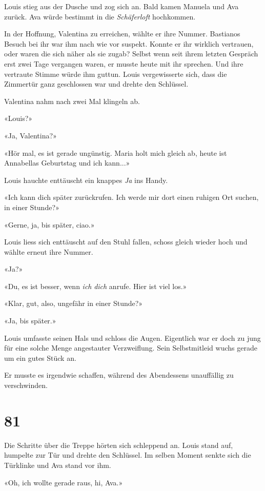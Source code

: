 Louis stieg aus der Dusche und zog sich an. Bald kamen Manuela und Ava
zurück. Ava würde bestimmt in die \emph{Schäferloft} hochkommen.

In der Hoffnung, Valentina zu erreichen, wählte er ihre Nummer.
Bastianos Besuch bei ihr war ihm nach wie vor suspekt. Konnte er ihr
wirklich vertrauen, oder waren die sich näher als sie zugab? Selbst wenn
seit ihrem letzten Gespräch erst zwei Tage vergangen waren, er musste
heute mit ihr sprechen. Und ihre vertraute Stimme würde ihm guttun.
Louis vergewisserte sich, dass die Zimmertür ganz geschlossen war und
drehte den Schlüssel.

Valentina nahm nach zwei Mal klingeln ab.

«Louis?»

«Ja, Valentina?»

«Hör mal, es ist gerade ungünstig. Maria holt mich gleich ab, heute ist
Annabellas Geburtstag und ich kann...»

Louis hauchte enttäuscht ein knappes \emph{Ja} ins Handy.

«Ich kann dich später zurückrufen. Ich werde mir dort einen ruhigen Ort
suchen, in einer Stunde?»

«Gerne, ja, bis später, ciao.»

Louis liess sich enttäuscht auf den Stuhl fallen, schoss gleich wieder
hoch und wählte erneut ihre Nummer.

«Ja?»

«Du, es ist besser, wenn \emph{ich} \emph{dich} anrufe. Hier ist viel
los.»

«Klar, gut, also, ungefähr in einer Stunde?»

«Ja, bis später.»

Louis umfasste seinen Hals und schloss die Augen. Eigentlich war er doch
zu jung für eine solche Menge angestauter Verzweiflung. Sein
Selbstmitleid wuchs gerade um ein gutes Stück an.

Er musste es irgendwie schaffen, während des Abendessens unauffällig zu
verschwinden.

\chapter{81}\label{section-81}

Die Schritte über die Treppe hörten sich schleppend an. Louis stand auf,
humpelte zur Tür und drehte den Schlüssel. Im selben Moment senkte sich
die Türklinke und Ava stand vor ihm.

«Oh, ich wollte gerade raus, hi, Ava.»

